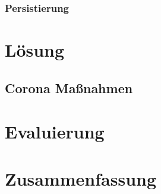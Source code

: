 \documentclass[12pt,oneside,a4paper,parskip]{scrbook}
\begin{document}
\subsection{Persistierung}

\chapter{Lösung}
\section{Corona Maßnahmen}


\chapter{Evaluierung}

\chapter{Zusammenfassung}


\backmatter

\listoffigures
{}

\listoftables


\cleardoublepage
{}
{}
\printbibliography

\end{document}
